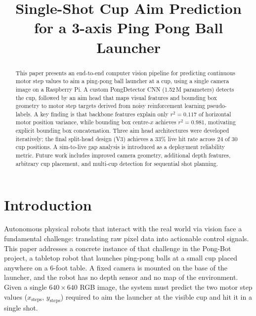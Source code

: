 \documentclass[conference]{IEEEtran}
\begin{document}
\title{Single-Shot Cup Aim Prediction for a 3-axis Ping Pong Ball Launcher}

\author{
}

\maketitle

\begin{abstract}
This paper presents an end-to-end computer vision pipeline for predicting
continuous motor step values to aim a ping-pong ball launcher at a cup, using
a single camera image on a Raspberry Pi. A custom PongDetector CNN (1.52\,M
parameters) detects the cup, followed by an aim head that maps visual features
and bounding box geometry to motor step targets derived from noisy
reinforcement learning pseudo-labels. A key finding is that backbone features
explain only $r^{2}=0.117$ of horizontal motor position variance, while
bounding box centre-$x$ achieves $r^{2}=0.981$, motivating explicit bounding
box concatenation. Three aim head architectures were developed iteratively; the
final split-head design (V3) achieves a 33\% live hit rate across 24 of 30 cup
positions. A sim-to-live gap analysis is introduced as a deployment reliability
metric. Future work includes improved camera geometry, additional depth features,
arbitrary cup placement, and multi-cup detection for sequential shot planning.
\end{abstract}

\section{Introduction}

Autonomous physical robots that interact with the real world via vision face a
fundamental challenge: translating raw pixel data into actionable control
signals. This paper addresses a concrete instance of that challenge in the
Pong-Bot project, a tabletop robot that launches ping-pong balls at a small cup
placed anywhere on a 6-foot table. A fixed camera is mounted on the base of the
launcher, and the robot has no depth sensor and no map of the environment.
Given a single $640{\times}640$ RGB image, the system must predict the two
motor step values ($x_\text{steps}$, $y_\text{steps}$) required to aim the
launcher at the visible cup and hit it in a single shot.
\end{document}
